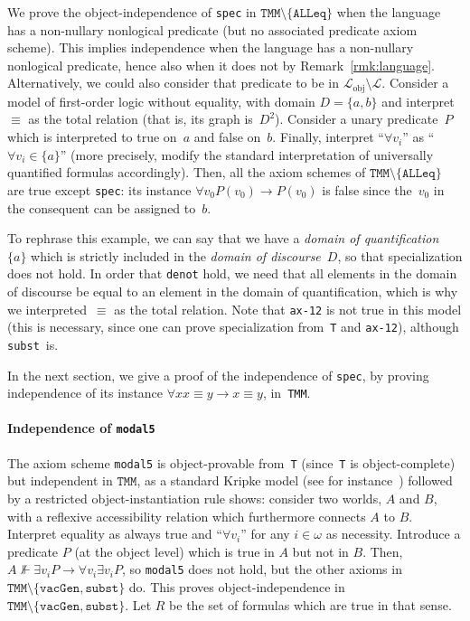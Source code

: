 \documentclass[11pt]{article}
\newcommand*{\calL}{\mathcal{L}}
\theoremstyle{plain}
\theoremstyle{definition}
\theoremstyle{remark}
\begin{document}
We prove the object-independence of \texttt{spec} in $\texttt{TMM} \setminus \{\texttt{ALLeq}\}$
when the language
has a non-nullary nonlogical predicate (but no associated predicate axiom scheme).
This implies independence when the language has a non-nullary nonlogical predicate, hence also
when it does not by Remark~\ref{rmk:language}.
Alternatively, we could also consider that predicate to be in $\calL_\text{obj} \setminus \calL$.
Consider a model of first-order logic without equality, with domain $D = \{ a, b\}$ and
interpret~$\equiv$ as the total relation (that is, its graph is~$D^2$).
Consider a unary predicate~$P$ which is interpreted to true on~$a$ and false on~$b$.
Finally, interpret ``$\forall v_i$'' as ``$\forall v_i \in \{a\}$'' (more precisely, modify the
standard interpretation of universally quantified formulas accordingly).
Then, all the axiom schemes of $\texttt{TMM} \setminus \{\texttt{ALLeq}\}$ are true except
\texttt{spec}: its instance $\forall v_0 P(v_0) \to P(v_0)$ is false since the~$v_0$ in the
consequent can be assigned to~$b$.

To rephrase this example, we can say that we have a \emph{domain of quantification}~$\{a\}$ which
is strictly included in the \emph{domain of discourse}~$D$, so that specialization does not hold.
In order that \texttt{denot} hold, we need that all elements in the domain of discourse be equal
to an element in the domain of quantification, which is why we interpreted~$\equiv$ as the total
relation.
Note that \texttt{ax-12} is not true in this model (this is necessary, since one can prove
specialization from~\texttt{T} and \texttt{ax-12}), although \texttt{subst}~is.

In the next section, we give a proof of the independence of \texttt{spec}, by proving independence
of its instance $\forall x x \equiv y \to x \equiv y$, in~\texttt{TMM}.


\paragraph{Independence of \texttt{modal5}}

The axiom scheme \texttt{modal5} is object-provable from~\texttt{T} (since~\texttt{T} is
object-complete) but independent in $\texttt{TMM}$, as a standard Kripke model (see for
instance~\cite{modal}) followed by a restricted object-instantiation rule shows: consider two
worlds, $A$ and $B$, with a reflexive accessibility relation which furthermore connects $A$ to $B$.
Interpret equality as always true and ``$\forall v_i$'' for any $i \in \omega$ as necessity.
Introduce a predicate $P$ (at the object level) which is true in $A$ but not in $B$.
Then, $A \not\Vdash \exists v_i P \to \forall v_i \exists v_i P$, so \texttt{modal5} does not hold,
but the other axioms in $\texttt{TMM} \setminus \{\texttt{vacGen}, \texttt{subst}\}$ do.
This proves object-independence in $\texttt{TMM} \setminus \{\texttt{vacGen}, \texttt{subst}\}$.
Let $R$ be the set of formulas which are true in that sense.
\end{document}
